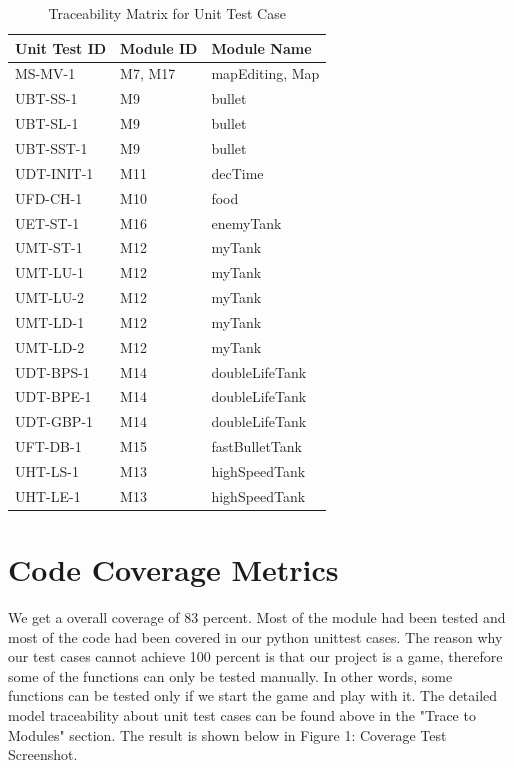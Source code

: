 \documentclass[12pt, titlepage]{article}
\begin{document}
\begin{table}[ht]
\begin{tabular}{|p{3cm}|p{3cm}|p{7cm}|}
 \hline
 Unit Test ID & Module ID & Module Name\\ 
 \hline
 MS-MV-1 & M7, M17 & mapEditing, Map\\ 
 \hline
 UBT-SS-1 & M9 & bullet\\ 
 \hline
 UBT-SL-1 & M9 & bullet\\
 \hline
 UBT-SST-1 & M9 & bullet\\
 \hline
 UDT-INIT-1 & M11 & decTime\\
  \hline
 UFD-CH-1 & M10 & food\\
  \hline
 UET-ST-1 & M16 & enemyTank\\
  \hline
 UMT-ST-1 & M12 & myTank\\
  \hline
 UMT-LU-1 & M12 & myTank\\
  \hline
 UMT-LU-2 & M12 & myTank\\
  \hline
 UMT-LD-1 & M12 & myTank\\
  \hline
 UMT-LD-2 & M12 & myTank\\
  \hline
 UDT-BPS-1 & M14 & doubleLifeTank\\
  \hline
 UDT-BPE-1 & M14 & doubleLifeTank\\
  \hline
 UDT-GBP-1 & M14 & doubleLifeTank\\
  \hline
 UFT-DB-1 & M15 & fastBulletTank\\
  \hline
 UHT-LS-1 & M13 & highSpeedTank\\
  \hline
 UHT-LE-1 & M13 & highSpeedTank\\
  \hline
 
 
\end{tabular}
\caption{Traceability Matrix for Unit Test Case}
\label{table: Traceability Matrix for Unit Test Cases to Module}
\end{table}

\section{Code Coverage Metrics}

We get a overall coverage of 83 percent. Most of the module had been tested and most of the code had been covered in our python unittest cases. The reason why our test cases cannot achieve 100 percent is that our project is a game, therefore some of the functions can only be tested manually. In other words, some functions can be tested only if we start the game and play with it. The detailed model traceability about unit test cases can be found above in the "Trace to Modules" section. The result is shown below in Figure 1: Coverage Test Screenshot.
\end{document}
